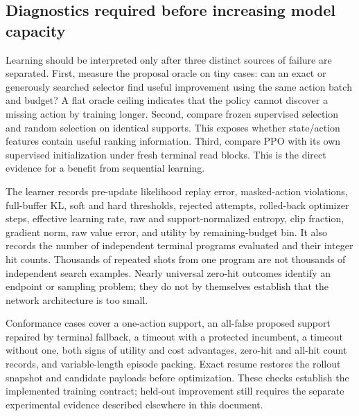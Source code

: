 \subsection{Diagnostics required before increasing model capacity}

Learning should be interpreted only after three distinct sources of failure are separated. First,
measure the proposal oracle on tiny cases: can an exact or generously searched selector find useful
improvement using the same action batch and budget? A flat oracle ceiling indicates that the policy
cannot discover a missing action by training longer. Second, compare frozen supervised selection and
random selection on identical supports. This exposes whether state/action features contain useful
ranking information. Third, compare PPO with its own supervised initialization under fresh terminal
read blocks. This is the direct evidence for a benefit from sequential learning.

The learner records pre-update likelihood replay error, masked-action violations, full-buffer KL,
soft and hard thresholds, rejected attempts, rolled-back optimizer steps, effective learning rate,
raw and support-normalized entropy, clip fraction, gradient norm, raw value error, and utility by
remaining-budget bin. It also records the number of independent terminal programs evaluated and
their integer hit counts. Thousands of repeated shots from one program are not thousands of
independent search examples. Nearly universal zero-hit outcomes identify an endpoint or sampling
problem; they do not by themselves establish that the network architecture is too small.

Conformance cases cover a one-action support, an all-false proposed support repaired by terminal
fallback, a timeout with a protected incumbent, a timeout without one, both signs of utility and
cost advantages, zero-hit and all-hit count records, and variable-length episode packing. Exact
resume restores the rollout snapshot and candidate payloads before optimization. These checks
establish the implemented training contract; held-out improvement still requires the separate
experimental evidence described elsewhere in this document.
